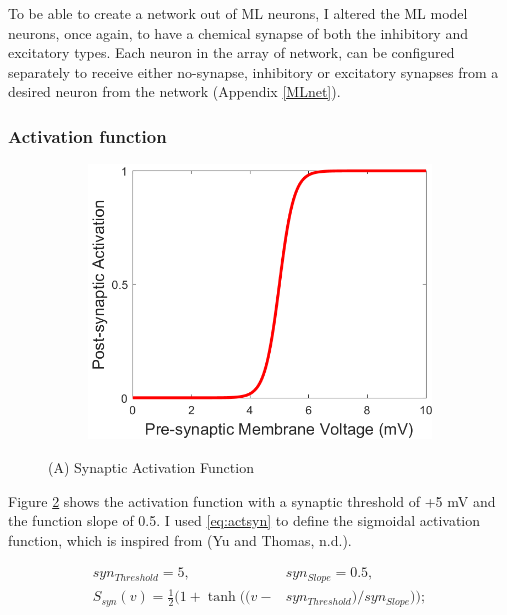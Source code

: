 \documentclass[
]{article}
\begin{document}
To be able to create a network out of ML neurons, I altered the ML model neurons, once again, to have a chemical synapse of both the inhibitory and excitatory types. Each neuron in the array of network, can be configured separately to receive either no-synapse, inhibitory or excitatory synapses from a desired neuron from the network (Appendix \ref{MLnet}).

\hypertarget{activation-function}{%
\subsubsection{Activation function}\label{activation-function}}

\begin{figure}
  \captionsetup[subfigure]{labelformat=empty} \centering
  \begin{subfigure}[b]{0.5\textwidth}
      \includegraphics[width=\textwidth]{figs/F2_A_ML_Synapse_ActFxn.png}
      \caption{} \label{fig:fig2act}
  \end{subfigure}
  \vspace{-0.75cm}
  \caption{(A) Synaptic Activation Function}
\end{figure}

Figure \ref{fig:fig2act} shows the activation function with a synaptic threshold of +5 mV and the function slope of 0.5. I used \eqref{eq:actsyn} to define the sigmoidal activation function, which is inspired from (Yu and Thomas, n.d.).

\begin{equation} \label{eq:actsyn}
\begin{split}
syn_{Threshold} = 5,\ &syn_{Slope} = 0.5, 
\\ S_{syn}(v) = \frac12(1+\tanh ((v-&syn_{Threshold})/syn_{Slope}));
\end{split}
\end{equation}
\end{document}
